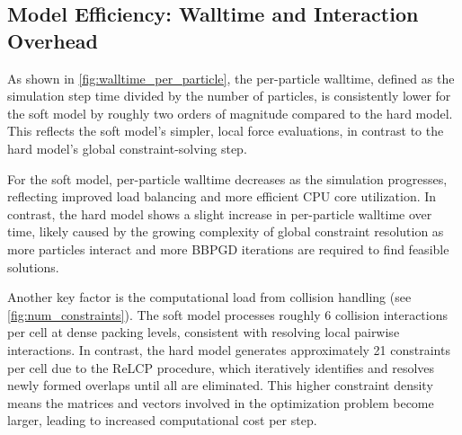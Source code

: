 \documentclass[conference]{IEEEtran}
\begin{document}
\subsection{Model Efficiency: Walltime and Interaction Overhead}
\label{sec:complexity_scalability}

As shown in \autoref{fig:walltime_per_particle}, the per-particle walltime, defined as the simulation step time divided by the number of particles, is consistently lower for the soft model by roughly two orders of magnitude compared to the hard model. This reflects the soft model's simpler, local force evaluations, in contrast to the hard model's global constraint-solving step.

For the soft model, per-particle walltime decreases as the simulation progresses, reflecting improved load balancing and more efficient CPU core utilization. In contrast, the hard model shows a slight increase in per-particle walltime over time, likely caused by the growing complexity of global constraint resolution as more particles interact and more BBPGD iterations are required to find feasible solutions.

Another key factor is the computational load from collision handling (see \autoref{fig:num_constraints}). The soft model processes roughly 6 collision interactions per cell at dense packing levels, consistent with resolving local pairwise interactions. In contrast, the hard model generates approximately 21 constraints per cell due to the ReLCP procedure, which iteratively identifies and resolves newly formed overlaps until all are eliminated. This higher constraint density means the matrices and vectors involved in the optimization problem become larger, leading to increased computational cost per step.
\end{document}
